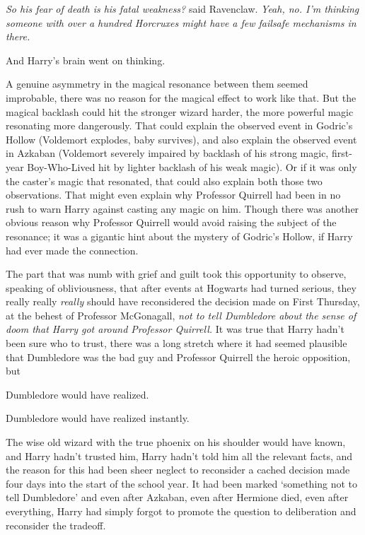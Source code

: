 \emph{So his fear of death is his fatal weakness?} said Ravenclaw. \emph{Yeah,
no. I'm thinking someone with over a hundred Horcruxes might have a few
failsafe mechanisms in there.}

And Harry's brain went on thinking.

A genuine asymmetry in the magical resonance between them{\el} seemed
improbable, there was no reason for the magical effect to work like that. But
the magical backlash could hit the stronger wizard harder, the more powerful
magic resonating more dangerously. That could explain the observed event in
Godric's Hollow (Voldemort explodes, baby survives), and also explain the
observed event in Azkaban (Voldemort severely impaired by backlash of his
strong magic, first-year Boy-Who-Lived hit by lighter backlash of his weak
magic). Or if it was only the caster's magic that resonated, that could also
explain both those two observations. That might even explain why Professor
Quirrell had been in no rush to warn Harry against casting any magic on him.
Though there was another obvious reason why Professor Quirrell would avoid
raising the subject of the resonance; it was a gigantic hint about the mystery
of Godric's Hollow, if Harry had ever made the connection.

The part that was numb with grief and guilt took this opportunity to observe,
speaking of obliviousness, that after events at Hogwarts had turned serious,
they really really \emph{really } should have reconsidered the decision
made on First Thursday, at the behest of Professor McGonagall, \emph{not to
tell Dumbledore about the sense of doom that Harry got around Professor
Quirrell.} It was true that Harry hadn't been sure who to trust, there was a
long stretch where it had seemed plausible that Dumbledore was the bad guy and
Professor Quirrell the heroic opposition, but{\el}

Dumbledore would have realized.

Dumbledore would have realized instantly.

The wise old wizard with the true phoenix on his shoulder would have known, and
Harry hadn't trusted him, Harry hadn't told him all the relevant facts, and the
reason for this had been sheer neglect to reconsider a cached decision made
four days into the start of the school year. It had been marked `something not
to tell Dumbledore' and even after Azkaban, even after Hermione died, even
after everything, Harry had simply forgot to promote the question to
deliberation and reconsider the tradeoff.

